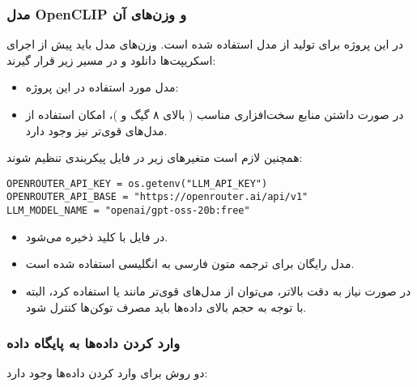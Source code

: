 \documentclass{article}
\begin{document}
\subsubsection{مدل OpenCLIP و وزن‌های آن}

در این پروژه برای تولید  از مدل  استفاده شده است.
وزن‌های مدل باید پیش از اجرای اسکریپت‌ها دانلود و در مسیر زیر قرار گیرند: \\

\begin{itemize}
\item مدل مورد استفاده در این پروژه: 
\item در صورت داشتن منابع سخت‌افزاری مناسب ( بالای ۸ گیگ و )، امکان استفاده از مدل‌های قوی‌تر نیز وجود دارد.

\end{itemize}

همچنین لازم است متغیرهای زیر در فایل پیکربندی  تنظیم شوند:

\begin{latin}
\begin{lstlisting}
OPENROUTER_API_KEY = os.getenv("LLM_API_KEY")
OPENROUTER_API_BASE = "https://openrouter.ai/api/v1"
LLM_MODEL_NAME = "openai/gpt-oss-20b:free"
\end{lstlisting}
\end{latin}

\begin{itemize}
\item {} در فایل  با کلید  ذخیره می‌شود.

\item مدل رایگان  برای ترجمه متون فارسی به انگلیسی استفاده شده است.

\item در صورت نیاز به دقت بالاتر، می‌توان از مدل‌های قوی‌تر مانند  یا  استفاده کرد، البته با توجه به حجم بالای داده‌ها باید مصرف توکن‌ها کنترل شود.

\end{itemize}

\subsubsection{وارد کردن داده‌ها به پایگاه داده}
دو روش برای وارد کردن داده‌ها وجود دارد:
\end{document}
